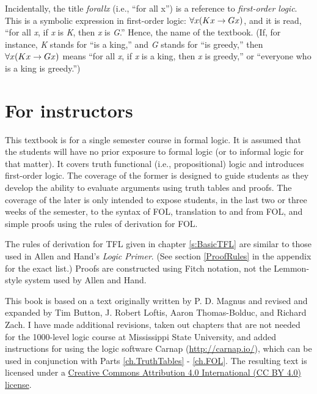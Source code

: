 Incidentally, the title \textit{forall\hspace{.10em}x} (i.e., ``for all x'') is a reference to \textit{first-order logic}. This is a symbolic expression in first-order logic: $\forall x(Kx \rightarrow Gx)$, and it is read, “for all \textit{x}, if \textit{x} is \textit{K}, then \textit{x} is \textit{G}.” Hence, the name of the textbook. (If, for instance, \textit{K} stands for ``is a king,'' and \textit{G} stands for ``is greedy,'' then $\forall x(Kx \rightarrow Gx)$ means ``for all \textit{x}, if \textit{x} is a king, then \textit{x} is greedy,'' or ``everyone who is a king is greedy.'') 


\section{For instructors}

This textbook is for a single semester course in formal logic. It is assumed that the students will  have no prior exposure to formal logic (or to informal logic for that matter). It covers truth functional (i.e., propositional) logic and introduces first-order logic. The coverage of the former is designed to guide students as they develop the ability to evaluate arguments using truth tables and proofs. The coverage of the later is only intended to expose students, in the last two or three weeks of the semester, to the syntax of FOL, translation to and from FOL, and simple proofs using the rules of derivation for FOL. 

The rules of derivation for TFL given in chapter \ref{s:BasicTFL} are similar to those used in Allen and Hand's \textit{Logic Primer}. (See section \ref{ProofRules} in the appendix for the exact list.) Proofs are constructed using Fitch notation, not the Lemmon-style system used by Allen and Hand.

This book is based on a text originally written by P. D. Magnus and revised and expanded by Tim Button, J. Robert Loftis, Aaron Thomas-Bolduc, and Richard Zach. I have made additional revisions, taken out chapters that are not needed for the 1000-level logic course at Mississippi State University, and added instructions for using the logic software Carnap (\href{http://carnap.io/}{http://carnap.io/}), which can be used in conjunction with Parts \ref{ch.TruthTables} - \ref{ch.FOL}. The resulting text is licensed under a \href{https://creativecommons.org/licenses/by/4.0/}{Creative Commons Attribution 4.0 International (CC BY 4.0) license}.

 
